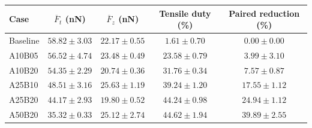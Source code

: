 \begin{tabular*}{\textwidth}{@{\extracolsep{\fill}}lcccc@{}}\toprule
Case & $\overline{F}_t$ (nN) & $\overline{F}_z$ (nN) & Tensile duty (\%) & Paired reduction (\%)\\\midrule
Baseline & $58.82 \pm 3.03$ & $22.17 \pm 0.55$ & $1.61 \pm 0.70$ & $0.00 \pm 0.00$ \\
A10B05 & $56.52 \pm 4.74$ & $23.48 \pm 0.49$ & $23.58 \pm 0.79$ & $3.99 \pm 3.10$ \\
A10B20 & $54.35 \pm 2.29$ & $20.74 \pm 0.36$ & $31.76 \pm 0.34$ & $7.57 \pm 0.87$ \\
A25B10 & $48.51 \pm 3.16$ & $25.63 \pm 1.19$ & $39.24 \pm 1.20$ & $17.55 \pm 1.12$ \\
A25B20 & $44.17 \pm 2.93$ & $19.80 \pm 0.52$ & $44.24 \pm 0.98$ & $24.94 \pm 1.12$ \\
A50B20 & $35.32 \pm 0.33$ & $25.12 \pm 2.74$ & $44.62 \pm 1.94$ & $39.89 \pm 2.55$ \\
\bottomrule
\end{tabular*}
